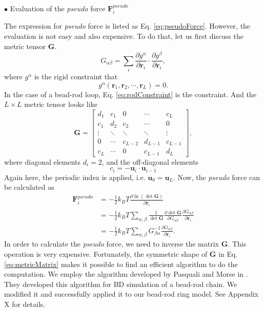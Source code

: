 $\bullet$ Evaluation of the \emph{pseudo} force $\mathbf{F}_i^{pseudo}$

The expression for \emph{pseudo} force is listed as Eq. \eqref{eq:pseudoForce}. However, the evaluation is not easy and also expensive. To do that, let us first discuss the metric tensor $\mathbf{G}$. 
\begin{equation}
    \label{eq:metricTensor}
    {G}_{\alpha\beta} = \sum_i \frac{\partial g^\alpha}{\partial \mathbf{r}_i} \cdot \frac{\partial g^\beta}{\partial \mathbf{r}_i},
\end{equation}
where $g^\alpha$ is the rigid constraint that 
\begin{equation}
    \label{eq:rigidConstraint}
    g^\alpha(\mathbf{r}_1,\mathbf{r}_2,\cdots,\mathbf{r}_{L}) = 0.
\end{equation}
In the case of a bead-rod loop, Eq. \eqref{eq:rodConstraint} is the constraint. And the $L\times L$ metric tensor looks like
\begin{equation}
    \label{eq:metricMatrix}
    \mathbf{G} = 
    \begin{bmatrix}
        d_1 & c_1 & 0   & \cdots  & c_L \\
        c_1 & d_2 & c_2  &  \cdots & 0 \\
        \vdots & \ddots &\ddots &\ddots &\vdots\\
        0 & \cdots & c_{L-2} & d_{L-1} & c_{L-1} \\
        c_L & \cdots & 0 & c_{L-1} & d_{L}
    \end{bmatrix},
\end{equation}
where diagonal elements $d_i = 2$, and the off-diagonal elements 
\begin{equation}
    c_i = -\mathbf{u}_i\cdot\mathbf{u}_{i-1}
\end{equation}
Again here, the periodic index is applied, i.e. $\mathbf{u}_0 = \mathbf{u}_L$. Now, the \emph{pseudo} force can be calculated as 
\begin{equation}
    \begin{aligned}
    \label{eq:pseudoForceEvaluate}
    \mathbf{F}_i^{pseudo} & = - \frac{1}{2} k_B T \frac{\partial \ln(\det\mathbf{G})}{\partial \mathbf{r}_i} \\
    & = - \frac{1}{2} k_B T \sum_{\alpha,\beta}\frac{1}{\det\mathbf{G}}\frac{\partial\det\mathbf{G}}{\partial{G}_{\alpha\beta}}\frac{\partial{G}_{\alpha\beta}}{\partial\mathbf{r}_i} \\
    & = - \frac{1}{2} k_B T \sum_{\alpha,\beta}{G}_{\beta\alpha}^{-1}\frac{\partial{G}_{\alpha\beta}}{\partial\mathbf{r}_i}.
    \end{aligned}
\end{equation}
In order to calculate the \emph{pseudo} force, we need to inverse the matrix $\mathbf{G}$. This operation is very expensive. Fortunately, the symmetric shape of $\mathbf{G}$ in Eq. \eqref{eq:metricMatrix} makes it possible to find an efficient algorithm to do the computation. We employ the algorithm developed by Pasquali and Morse in \cite{Pasquali2002}. They developed this algorithm for BD simulation of a bead-rod chain. We modified it and successfully applied it to our bead-rod ring model. See Appendix X for details.  

